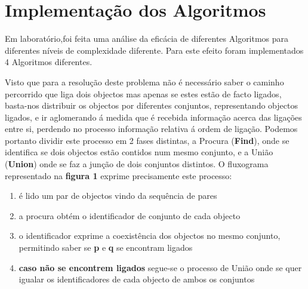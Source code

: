\documentclass[10pt,a4paper]{article}
\begin{document}
\section{Implementaç\~ao dos Algoritmos}

\par Em laboratório,foi feita uma análise da eficácia de diferentes Algoritmos para diferentes níveis de complexidade diferente. Para este efeito foram implementados 4 Algoritmos diferentes.
\par Visto que para a resolução deste problema não é necessário saber o caminho percorrido que liga dois objectos mas apenas se estes estão de facto ligados, basta-nos distribuir os objectos por diferentes conjuntos, representando objectos ligados, e ir aglomerando á medida que é recebida informação acerca das ligações entre si, perdendo no processo informação relativa á ordem de ligação. Podemos portanto dividir este processo em 2 fases distintas, a Procura (\textbf{Find}), onde se identifica se dois objectos estão contidos num mesmo conjunto, e a União (\textbf{Union}) onde se faz a junção de dois conjuntos distintos. O fluxograma representado na \textbf{figura 1} exprime precisamente este processo:
\begin{enumerate}
\item é lido um par de objectos vindo da sequência de pares
\item a procura obtém o identificador de conjunto de cada objecto
\item o identificador exprime a coexistência dos objectos no mesmo conjunto, permitindo saber se \textbf{p} e \textbf{q} se encontram ligados
\item \textbf{caso não se encontrem ligados} segue-se o processo de União onde se quer igualar os identificadores de cada objecto de ambos os conjuntos
\end{enumerate}
\end{document}
